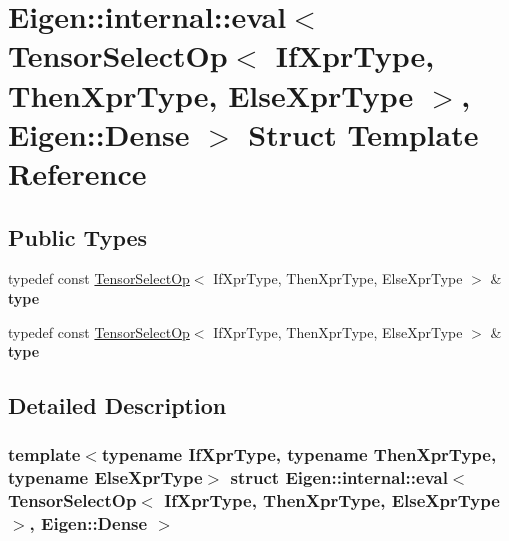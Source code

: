 \hypertarget{struct_eigen_1_1internal_1_1eval_3_01_tensor_select_op_3_01_if_xpr_type_00_01_then_xpr_type_00_0a870a7ff2702168df3e9b7b8d1181076}{}\section{Eigen\+:\+:internal\+:\+:eval$<$ Tensor\+Select\+Op$<$ If\+Xpr\+Type, Then\+Xpr\+Type, Else\+Xpr\+Type $>$, Eigen\+:\+:Dense $>$ Struct Template Reference}
\label{struct_eigen_1_1internal_1_1eval_3_01_tensor_select_op_3_01_if_xpr_type_00_01_then_xpr_type_00_0a870a7ff2702168df3e9b7b8d1181076}
\subsection*{Public Types}
\begin{DoxyCompactItemize}
\item 
\mbox{\label{struct_eigen_1_1internal_1_1eval_3_01_tensor_select_op_3_01_if_xpr_type_00_01_then_xpr_type_00_0a870a7ff2702168df3e9b7b8d1181076_ad89e726a4cade10b810f686837240ac2}} 
typedef const \hyperlink{class_eigen_1_1_tensor_select_op}{Tensor\+Select\+Op}$<$ If\+Xpr\+Type, Then\+Xpr\+Type, Else\+Xpr\+Type $>$ \& {\bfseries type}
\item 
\mbox{\label{struct_eigen_1_1internal_1_1eval_3_01_tensor_select_op_3_01_if_xpr_type_00_01_then_xpr_type_00_0a870a7ff2702168df3e9b7b8d1181076_ad89e726a4cade10b810f686837240ac2}} 
typedef const \hyperlink{class_eigen_1_1_tensor_select_op}{Tensor\+Select\+Op}$<$ If\+Xpr\+Type, Then\+Xpr\+Type, Else\+Xpr\+Type $>$ \& {\bfseries type}
\end{DoxyCompactItemize}


\subsection{Detailed Description}
\subsubsection*{template$<$typename If\+Xpr\+Type, typename Then\+Xpr\+Type, typename Else\+Xpr\+Type$>$\newline
struct Eigen\+::internal\+::eval$<$ Tensor\+Select\+Op$<$ If\+Xpr\+Type, Then\+Xpr\+Type, Else\+Xpr\+Type $>$, Eigen\+::\+Dense $>$}



